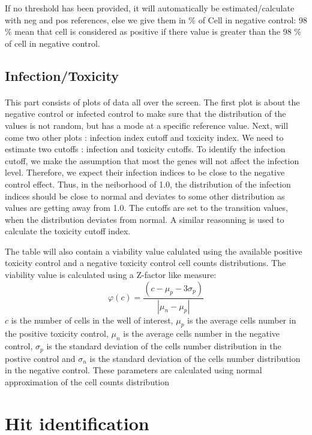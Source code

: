 \documentclass[a4paper,10pt]{article}
\begin{document}
If no threshold has been provided, it will automatically be estimated/calculate with neg and pos references, else 
we give them in \% of Cell in negative control:  98 \% mean that cell is considered as positive if there value is greater than the 98 \% of cell
in negative control. 


\subsection*{Infection/Toxicity}
\paragraph*{}


This part consists of plots of data all over the screen. The first plot is
about the negative control or infected control to make sure that the distribution
of the values is not random, but has a mode at a specific reference value. Next, will
come two other plots : infection index cutoff and toxicity index.
We need to estimate two cutoffs : infection and toxicity cutoffs. 
To identify the infection cutoff, we make the assumption that most 
the genes will not affect the infection level. Therefore, we expect 
their infection indices to be close to the negative control effect.
Thus, in the neiborhood of 1.0, the distribution of the infection indices 
should be close to normal and deviates to some other distribution as 
values are getting away from 1.0. The cutoffs are set to the transition 
values, when the distribution deviates from normal. A similar reasonning 
is used to calculate the toxicity cutoff index.


The table will also contain a viability value calulated using
the available positive toxicity control and a negative toxicity control cell counts distributions. The viability value
is calculated using a Z-factor like measure: 
\[\varphi(c)=\frac{(c-\mu_p-3\sigma_p)}{|\mu_n-\mu_p|}\]
$c$ is the number of cells in the well of interest, $\mu_p$ is the average cells number in the positive toxicity
control, $\mu_n$ is the average cells number in the negative control, $\sigma_p$ is the standard deviation of the
cells number distribution in the postive control and $\sigma_n$ is the standard deviation of the cells number 
distribution in the negative control. These parameters are calculated using normal approximation of the cell counts 
distribution

\newpage

\section*{Hit identification}
\end{document}

